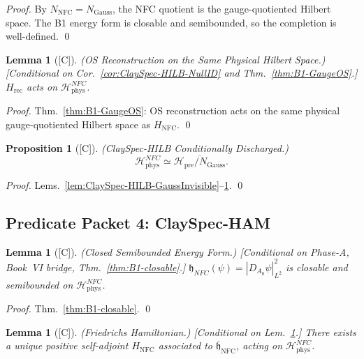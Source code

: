 \documentclass[12pt,oneside]{amsbook}
\theoremstyle{plain}
\newtheorem{lemma}[theorem]{Lemma}
\newtheorem{proposition}[theorem]{Proposition}
\theoremstyle{definition}
\theoremstyle{remark}
\newcommand{\status}[1]{\textup{[#1]}}
\begin{document}
\begin{proof}
By $N_{\mathrm{NFC}}=N_{\mathrm{Gauss}}$, the NFC quotient is the
gauge-quotiented Hilbert space. The B1 energy form is closable and
semibounded, so the completion is well-defined.
\qed
\end{proof}

\begin{lemma}[\status{C}]\label{lem:ClaySpec-HILB-OSAlignment}
\textup{(OS Reconstruction on the Same Physical Hilbert Space.)}
\textup{[Conditional on Cor.~\ref{cor:ClaySpec-HILB-NullID}
and Thm.~\ref{thm:B1-GaugeOS}.]}
$H_{\mathrm{rec}}$ acts on $\mathcal{H}^{NFC}_{\mathrm{phys}}$.
\end{lemma}

\begin{proof}
Thm.~\ref{thm:B1-GaugeOS}: OS reconstruction acts on the same
physical gauge-quotiented Hilbert space as $H_{\mathrm{NFC}}$.
\qed
\end{proof}

\begin{proposition}[\status{C}]\label{prop:ClaySpec-HILB}
\textup{(ClaySpec-HILB Conditionally Discharged.)}
\[
 \boxed{\mathcal{H}^{NFC}_{\mathrm{phys}}\simeq
 \overline{\mathcal{H}_{\mathrm{pre}}/N_{\mathrm{Gauss}}}.}
\]
\end{proposition}

\begin{proof}
Lems.~\ref{lem:ClaySpec-HILB-GaussInvisible}--\ref{lem:ClaySpec-HILB-OSAlignment}.
\qed
\end{proof}

\subsection{Predicate Packet 4: ClaySpec-HAM}

\begin{lemma}[\status{C}]\label{lem:ClaySpec-HAM-form-closed}
\textup{(Closed Semibounded Energy Form.)}
\textup{[Conditional on Phase-A, Book~VI bridge, Thm.~\ref{thm:B1-closable}.]}
$\mathfrak{h}_{NFC}(\psi)=|D_{A_0}\psi|^2_{L^2}$ is closable and
semibounded on $\mathcal{H}^{NFC}_{\mathrm{phys}}$.
\end{lemma}

\begin{proof}
Thm.~\ref{thm:B1-closable}.
\qed
\end{proof}

\begin{lemma}[\status{C}]\label{lem:ClaySpec-HAM-Friedrichs}
\textup{(Friedrichs Hamiltonian.)}
\textup{[Conditional on Lem.~\ref{lem:ClaySpec-HAM-form-closed}.]}
There exists a unique positive self-adjoint $H_{\mathrm{NFC}}$ associated
to $\overline{\mathfrak{h}}_{\mathrm{NFC}}$, acting on
$\mathcal{H}^{NFC}_{\mathrm{phys}}$.
\end{lemma}
\end{document}
